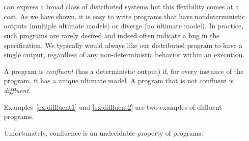 \section{\slang}
\label{sec:confluence}

\lang can express a broad class of distributed systems but this flexibility comes at a cost.
As we have shown, it is easy to write programs that have nondeterministic
outputs (multiple ultimate models) or diverge (no ultimate model).   In practice, such programs are rarely 
desired and indeed often indicate a bug in the specification.
We typically would always like our distributed program to have a single output, regardless of any non-deterministic behavior within an execution.

\begin{definition}
A \lang program is {\em confluent} (has a deterministic output) if, for every instance of the program, it has a unique ultimate model.  A program that is not confluent is {\em diffluent}.
\end{definition}

Examples~\ref{ex:diffluent1} and \ref{ex:diffluent2} are two examples of diffluent programs.

Unfortunately, confluence is an undecidable property of \lang programs:

